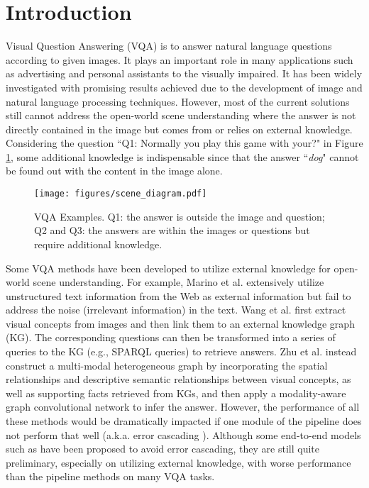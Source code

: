 \documentclass[runningheads]{llncs}
\newcommand{\chenzhuo}[1]{{\color{black}#1}}
\newcommand{\cjy}[1]{{\color{black}#1}}
\newcommand{\jeff}[1]{{\color{black}#1}}
\begin{document}
\section{Introduction}
Visual Question Answering (VQA) is to answer 
\cjy{natural language questions according to given images. 
It plays an important role in many applications such as advertising and personal assistants to the visually impaired. \jeff{It} has been widely investigated with promising results achieved due to the development of image and natural language processing techniques.}
However, most of the current solutions still cannot address the open-world scene understanding where the answer is not directly contained in the image but comes from or relies on external knowledge.
\cjy{Considering} the question ``\cjy{Q1:} Normally you play this game with your?" in Figure \ref{fig:example}, 
some additional knowledge is indispensable since that the answer ``{\it dog}" cannot be found out with the \cjy{content} in the image alone. 

\begin{figure}[htbp]
\centering
\texttt{[image: figures/scene\_diagram.pdf]}
\caption{\cjy{VQA Examples. Q1: the answer is outside the image and question; Q2 and Q3: the answers are within the images or questions \chenzhuo{but require additional knowledge}.}}
\label{fig:example}
\end{figure}
Some VQA methods have been developed to utilize external knowledge for open-world scene understanding. For example, Marino et al. \cite{DBLP:conf/cvpr/MarinoRFM19} extensively \cjy{utilize} unstructured text information from the \cjy{Web as external information but fail to address the noise (irrelevant information) in the text. }
Wang et al. \cite{DBLP:journals/pami/WangWSDH18} first \cjy{extract} visual concepts from images and \cjy{then link} them to an external knowledge graph (KG).  The corresponding questions can then be transformed into a series of \cjy{queries to the KG} (e.g., SPARQL queries) to retrieve \cjy{answers}. 
Zhu et al. \cite{DBLP:conf/ijcai/ZhuYWS0W20} instead construct a multi-modal heterogeneous graph by incorporating the spatial relationships and descriptive semantic relationships between visual concepts, as well as \cjy{supporting} facts retrieved from KGs, 
and then apply a modality-aware graph convolutional network to infer the answer.
However, the performance of all these methods would be dramatically impacted if one module of the pipeline does not perform that well \cjy{(a.k.a. error cascading \cite{DBLP:conf/emnlp/ChenZCXWW20}).}
Although \cjy{some end-to-end models such as \cite{DBLP:conf/nips/KimJZ18,DBLP:conf/cvpr/00010BT0GZ18} have been proposed } to avoid error cascading, they are \cjy{still quite preliminary, especially on utilizing external knowledge, with worse performance than the pipeline methods on many VQA tasks.}
\end{document}

